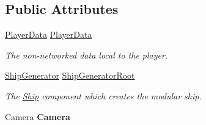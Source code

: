 \subsection*{Public Attributes}
\begin{DoxyCompactItemize}
\item 
\hyperlink{class_skyrates_1_1_data_1_1_player_data}{Player\-Data} \hyperlink{class_skyrates_1_1_entity_1_1_entity_player_ship_a9dff4c7af9e4872a6bd58b821d12d3df}{Player\-Data}
\begin{DoxyCompactList}\small\item\em The non-\/networked data local to the player. \end{DoxyCompactList}\item 
\hyperlink{class_skyrates_1_1_ship_1_1_ship_generator}{Ship\-Generator} \hyperlink{class_skyrates_1_1_entity_1_1_entity_player_ship_abec0fc0c6cc3462c7019ac48b74879ca}{Ship\-Generator\-Root}
\begin{DoxyCompactList}\small\item\em The \hyperlink{namespace_skyrates_1_1_ship}{Ship} component which creates the modular ship. \end{DoxyCompactList}\item 
\hypertarget{class_skyrates_1_1_entity_1_1_entity_player_ship_a2643e297b60a7d0a77941e7f2b9d4256}{Camera {\bfseries Camera}}\label{class_skyrates_1_1_entity_1_1_entity_player_ship_a2643e297b60a7d0a77941e7f2b9d4256}

\end{DoxyCompactItemize}
